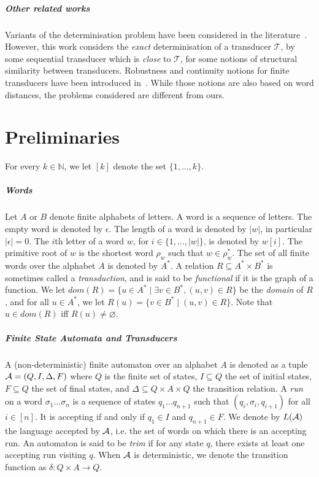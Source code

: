 \documentclass[a4paper,UKenglish,cleveref, autoref, thm-restate,authorcolumns, colorlinks]{lipics-v2021}
\newcommand\dom{\mathit{dom}}
\newcommand\calT{\mathcal{T}}
\begin{document}
\subparagraph*{Other related works} Variants of the determinisation problem have been considered in the literature~\cite{DBLP:conf/icalp/FiliotJLW16}. However, this work considers the \emph{exact} determinisation of a transducer $\calT$, by some sequential transducer which is \emph{close} to $\calT$, for some notions of structural similarity between transducers.  Robustness and continuity notions for finite transducers have been introduced in~\cite{DBLP:conf/fsttcs/HenzingerOS14}. While those notions are also based on word distances, the problems considered are different from ours.

\section{Preliminaries}


For every $k \in \mathbb{N}$, we let $[k]$ denote the set $\{1,\ldots, k\}$. 

\subparagraph*{Words} Let $A$ or $B$ denote finite alphabets of letters. A word is a sequence of letters. The empty word is denoted by $\epsilon$. The length of a word is denoted by $|w|$, in particular $|\epsilon|=0$. The $i$th letter of a word $w$, for $i\in\{1,\dots,|w|\}$, is denoted by $w[i]$. The primitive root of $w$ is the shortest word $\rho_w$ such that $w\in\rho_w^*$. 
The set of all finite words over the alphabet $A$ is denoted by $A^*$. A relation $R\subseteq A^*\times B^*$ is sometimes called a \emph{transduction}, and is said to be \emph{functional} if it is the graph of a function. We let $\dom(R) = \{ u\in A^*\mid \exists v\in B^*, (u,v)\in R\}$ be the \emph{domain} of $R$, and for all $u\in A^*$, we let $R(u) = \{v\in B^*\mid (u,v)\in R\}$. Note that $u\in\dom(R)$ iff $R(u)\neq\varnothing$.

\subparagraph*{Finite State Automata and Transducers} A (non-deterministic) finite automaton over an alphabet $A$ is denoted as a tuple ${\cal A} = (Q, I, \Delta, F)$ where $Q$ is the finite set of states, $I\subseteq Q$ the set of initial states, $F\subseteq Q$ the set of final states, and $\Delta\subseteq Q\times A \times Q$ the transition relation. A \emph{run} on a word $\sigma_1\dots \sigma_n$ is a sequence of states $q_1\dots q_{n+1}$ such that  $(q_i,\sigma_i,q_{i+1})$ for all $i\in[n]$. It is accepting if and only if $q_1\in I$ and $q_{n+1}\in F$. We denote by $L(\cal A)$ the language accepted by $\cal A$, i.e. the set of words on which there is an accepting run. An automaton is said to be \emph{trim} if for any state $q$, there exists at least one accepting run visiting $q$. When ${\cal A}$ is deterministic, we denote the transition function as $\delta : Q\times A \rightarrow Q$.
\end{document}
